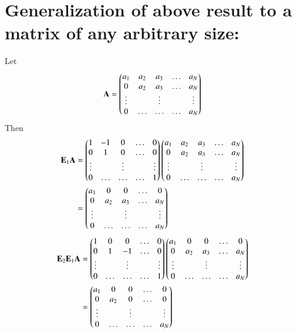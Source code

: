 \documentclass[journal,12pt,twocolumn]{IEEEtran}
\begin{document}
\section{Generalization of above result to a matrix of any arbitrary size:}
Let
\begin{align}
	\mathbf{A} = \begin{pmatrix} a_1 & a_2 & a_3 & \ldots & a_N \\
			    0 & a_2 & a_3 & \ldots & a_N \\
			  \vdots & & \vdots &  & \vdots  \\
			    0 & \ldots & \ldots & \ldots & a_N \end{pmatrix}
\end{align}
Then
\begin{align}
	\mathbf{E}_1\mathbf{A} &= \begin{pmatrix}1 & -1 & 0 & \ldots & 0 \\
			    0 & 1 & 0 & \ldots & 0 \\
			  \vdots & & \vdots &  & \vdots  \\
			    0 & \ldots & \ldots & \ldots & 1 \end{pmatrix}
	\begin{pmatrix} a_1 & a_2 & a_3 & \ldots & a_N \\
			    0 & a_2 & a_3 & \ldots & a_N \\
			  \vdots & & \vdots &  & \vdots  \\
			    0 & \ldots & \ldots & \ldots & a_N \end{pmatrix} \\
	&=
	\begin{pmatrix} a_1 & 0 & 0 & \ldots & 0 \\
			    0 & a_2 & a_3 & \ldots & a_N \\
			  \vdots & & \vdots &  & \vdots  \\
			    0 & \ldots & \ldots & \ldots & a_N \end{pmatrix}
\end{align}
\begin{align}
	\mathbf{E}_2\mathbf{E}_1\mathbf{A} &= \begin{pmatrix}1 & 0 & 0 & \ldots & 0 \\
			    0 & 1 &-1 & \ldots & 0 \\
			  \vdots & & \vdots &  & \vdots  \\
			    0 & \ldots & \ldots & \ldots & 1 \end{pmatrix}
	\begin{pmatrix} a_1 & 0 & 0 & \ldots & 0 \\
			    0 & a_2 & a_3 & \ldots & a_N \\
			  \vdots & & \vdots &  & \vdots  \\
			    0 & \ldots & \ldots & \ldots & a_N \end{pmatrix} \\
		&=
	\begin{pmatrix} a_1 & 0 & 0 & \ldots & 0 \\
			    0 & a_2 & 0 & \ldots & 0 \\
			  \vdots & & \vdots &  & \vdots  \\
			    0 & \ldots & \ldots & \ldots & a_N \end{pmatrix}
\end{align}
\end{document}
